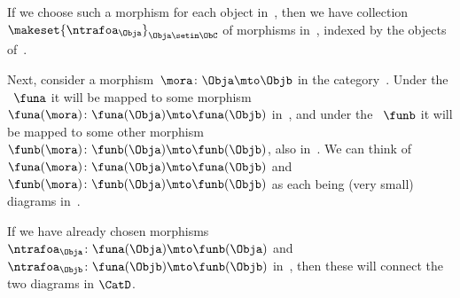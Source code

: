\begin{figure}[h]
    \centering
    \begin{ctdefinitionshade}
        \small
    \end{ctdefinitionshade}
    \caption{}
    \label{fig:natural_setup_obj}
\end{figure}

If we choose such a morphism for each object in~\CatC, then we have collection~$\makeset{ \ntrafoa_\Obja }_{\Obja \setin \ObC}$ of morphisms in~\CatD, indexed by the objects of~\CatC.

Next, consider a morphism~$\mora \colon \Obja \mto \Objb$ in the category~\CatC.
Under the ~$\funa$ it will be mapped to some morphism~$\funa(\mora)\colon \funa(\Obja) \mto \funa(\Objb)$ in~\CatD, and under the ~$\funb$ it will be mapped to some other morphism~$\funb(\mora)\colon \funb(\Obja) \mto \funb(\Objb)$, also in~\CatD. We can think of~$\funa(\mora)\colon \funa(\Obja) \mto \funa(\Objb)$ and~$\funb(\mora)\colon \funb(\Obja) \mto \funb(\Objb)$ as each being (very small) diagrams in~\CatD.
\begin{figure}[h!]
    \centering
    \begin{ctdefinitionshade}
        \small
    \end{ctdefinitionshade}
    \caption{}
    \label{fig:natural_setup_mor}
\end{figure}






If we have already chosen morphisms~$\ntrafoa_\Obja\colon \funa(\Obja) \mto \funb(\Obja)$ and~$\ntrafoa_\Objb\colon \funa(\Objb) \mto \funb(\Objb)$ in~\CatD, then these will connect the two diagrams in $\CatD$.

\begin{figure}[h!]
    \centering
    \begin{ctdefinitionshade}
        \small
    \end{ctdefinitionshade}
    \caption{}
    \label{fig:natural_setup_square}
\end{figure}



